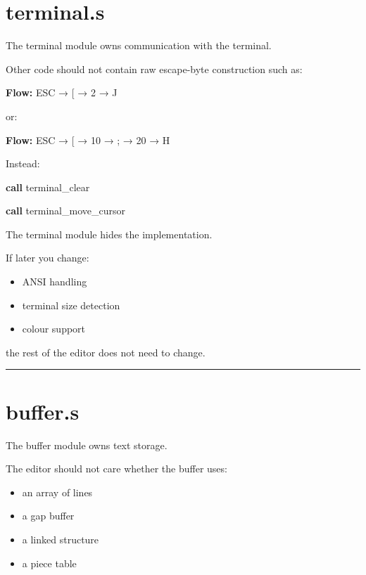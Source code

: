 \documentclass[
  oneside,
  openany]{book}
\newenvironment{Shaded}{\begin{snugshade}}{\end{snugshade}}
\newcommand{\ControlFlowTok}[1]{\textcolor[rgb]{0.13,0.29,0.53}{\textbf{#1}}}
\newcommand{\NormalTok}[1]{#1}
\providecommand{\tightlist}{%
  \setlength{\itemsep}{0pt}\setlength{\parskip}{0pt}}
\begin{document}
\hypertarget{terminal.s}{%
\section{terminal.s}\label{terminal.s}}

The terminal module owns communication with the terminal.

Other code should not contain raw escape-byte construction such as:

\textbf{Flow:} ESC → {[} → 2 → J

or:

\textbf{Flow:} ESC → {[} → 10 → ; → 20 → H

Instead:

\begin{Shaded}
\begin{Highlighting}[]
\ControlFlowTok{call}\NormalTok{ terminal\_clear}

\ControlFlowTok{call}\NormalTok{ terminal\_move\_cursor}
\end{Highlighting}
\end{Shaded}

The terminal module hides the implementation.

If later you change:

\begin{itemize}
\tightlist
\item
  ANSI handling
\item
  terminal size detection
\item
  colour support
\end{itemize}

the rest of the editor does not need to change.

\begin{center}\rule{0.5\linewidth}{0.5pt}\end{center}

\hypertarget{buffer.s}{%
\section{buffer.s}\label{buffer.s}}

The buffer module owns text storage.

The editor should not care whether the buffer uses:

\begin{itemize}
\tightlist
\item
  an array of lines
\item
  a gap buffer
\item
  a linked structure
\item
  a piece table
\end{itemize}
\end{document}
